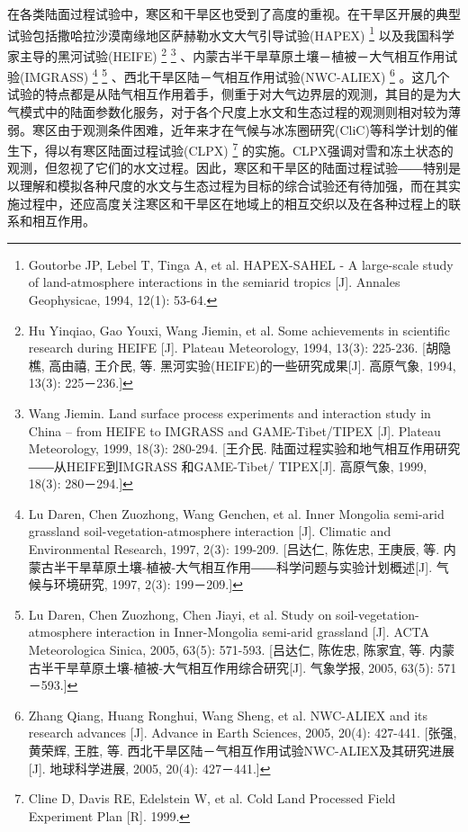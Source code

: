 \documentclass[letterpaper,10pt,english]{sphinxmanual}
\begin{document}
在各类陆面过程试验中，寒区和干旱区也受到了高度的重视。在干旱区开展的典型试验包括撒哈拉沙漠南缘地区萨赫勒水文大气引导试验(HAPEX) \footnote{
Goutorbe JP, Lebel T, Tinga A, et al. HAPEX-SAHEL - A large-scale study of land-atmosphere interactions in the semiarid tropics {[}J{]}. Annales Geophysicae, 1994, 12(1): 53-64.
} 以及我国科学家主导的黑河试验(HEIFE) \footnote{
Hu Yinqiao, Gao Youxi, Wang Jiemin, et al. Some achievements in scientific research during HEIFE {[}J{]}. Plateau Meteorology, 1994, 13(3): 225-236. {[}胡隐樵, 高由禧, 王介民, 等. 黑河实验(HEIFE)的一些研究成果{[}J{]}. 高原气象, 1994, 13(3): 225－236.{]}
}  \footnote{
Wang Jiemin. Land surface process experiments and interaction study in China – from HEIFE to IMGRASS and GAME-Tibet/TIPEX {[}J{]}. Plateau Meteorology, 1999, 18(3): 280-294. {[}王介民. 陆面过程实验和地气相互作用研究――从HEIFE到IMGRASS 和GAME-Tibet/ TIPEX{[}J{]}. 高原气象, 1999, 18(3): 280－294.{]}
} 、内蒙古半干旱草原土壤－植被－大气相互作用试验(IMGRASS) \footnote{
Lu Daren, Chen Zuozhong, Wang Genchen, et al. Inner Mongolia semi-arid grassland soil-vegetation-atmosphere interaction {[}J{]}. Climatic and Environmental Research, 1997, 2(3): 199-209. {[}吕达仁, 陈佐忠, 王庚辰, 等. 内蒙古半干旱草原土壤-植被-大气相互作用――科学问题与实验计划概述{[}J{]}. 气候与环境研究, 1997, 2(3): 199－209.{]}
} \footnote{
Lu Daren, Chen Zuozhong, Chen Jiayi, et al. Study on soil-vegetation-atmosphere interaction in Inner-Mongolia semi-arid grassland {[}J{]}. ACTA Meteorologica Sinica, 2005, 63(5): 571-593. {[}吕达仁, 陈佐忠, 陈家宜, 等. 内蒙古半干旱草原土壤-植被-大气相互作用综合研究{[}J{]}. 气象学报, 2005, 63(5): 571－593.{]}
} 、西北干旱区陆－气相互作用试验(NWC-ALIEX) \footnote{
Zhang Qiang, Huang Ronghui, Wang Sheng, et al. NWC-ALIEX and its research advances {[}J{]}. Advance in Earth Sciences, 2005, 20(4): 427-441. {[}张强, 黄荣辉, 王胜, 等. 西北干旱区陆－气相互作用试验NWC-ALIEX及其研究进展{[}J{]}. 地球科学进展, 2005, 20(4): 427－441.{]}
} 。这几个试验的特点都是从陆气相互作用着手，侧重于对大气边界层的观测，其目的是为大气模式中的陆面参数化服务，对于各个尺度上水文和生态过程的观测则相对较为薄弱。寒区由于观测条件困难，近年来才在气候与冰冻圈研究(CliC)等科学计划的催生下，得以有寒区陆面过程试验(CLPX) \footnote{
Cline D, Davis RE, Edelstein W, et al. Cold Land Processed Field Experiment Plan {[}R{]}. 1999.
} 的实施。CLPX强调对雪和冻土状态的观测，但忽视了它们的水文过程。因此，寒区和干旱区的陆面过程试验――特别是以理解和模拟各种尺度的水文与生态过程为目标的综合试验还有待加强，而在其实施过程中，还应高度关注寒区和干旱区在地域上的相互交织以及在各种过程上的联系和相互作用。
\end{document}
